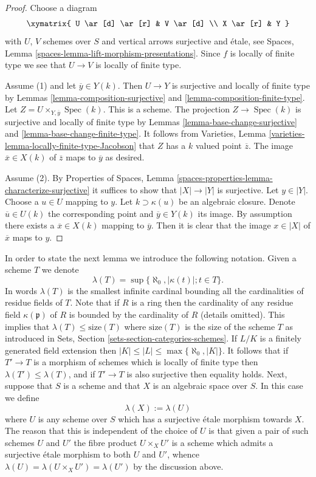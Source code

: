 \documentclass{stacks-project}
\theoremstyle{plain}
\theoremstyle{definition}
\theoremstyle{remark}
\numberwithin{equation}{subsection}
\def\Spec{\mathop{\mathrm{Spec}}}
\begin{document}
\begin{proof}
Choose a diagram
$$
\xymatrix{
U \ar[d] \ar[r] & V \ar[d] \\
X \ar[r] & Y
}
$$
with $U$, $V$ schemes over $S$ and vertical arrows surjective
and \'etale, see
Spaces, Lemma \ref{spaces-lemma-lift-morphism-presentations}.
Since $f$ is locally of finite type we see that $U \to V$ is locally of
finite type.

\medskip\noindent
Assume (1) and let $\overline{y} \in Y(k)$. Then $U \to Y$ is
surjective and locally of finite type by
Lemmas \ref{lemma-composition-surjective} and
\ref{lemma-composition-finite-type}.
Let $Z = U \times_{Y, \overline{y}} \Spec(k)$. This is a scheme.
The projection $Z \to \Spec(k)$
is surjective and locally of finite type by
Lemmas \ref{lemma-base-change-surjective} and
\ref{lemma-base-change-finite-type}.
It follows from
Varieties, Lemma \ref{varieties-lemma-locally-finite-type-Jacobson}
that $Z$ has a $k$ valued point $\overline{z}$. The image
$\overline{x} \in X(k)$ of $\overline{z}$ maps to $\overline{y}$
as desired.

\medskip\noindent
Assume (2). By
Properties of Spaces,
Lemma \ref{spaces-properties-lemma-characterize-surjective}
it suffices to show that $|X| \to |Y|$ is surjective.
Let $y \in |Y|$. Choose a $u \in U$ mapping to $y$.
Let $k \supset \kappa(u)$ be an algebraic closure. Denote
$\overline{u} \in U(k)$ the corresponding point and
$\overline{y} \in Y(k)$ its image. By assumption there exists
a $\overline{x} \in X(k)$ mapping to $\overline{y}$.
Then it is clear that the image $x \in |X|$ of $\overline{x}$
maps to $y$.
\end{proof}

\noindent
In order to state the next lemma we introduce the following
notation. Given a scheme $T$ we denote
$$
\lambda(T) = \sup\{\aleph_0, |\kappa(t)| ; t \in T\}.
$$
In words $\lambda(T)$ is the smallest infinite cardinal bounding
all the cardinalities of residue fields of $T$. Note that if $R$
is a ring then the cardinality of any residue field $\kappa(\mathfrak p)$
of $R$ is bounded by the cardinality of $R$ (details omitted).
This implies that $\lambda(T) \leq \text{size}(T)$ where
$\text{size}(T)$ is the size of the scheme $T$ as introduced in
Sets, Section \ref{sets-section-categories-schemes}.
If $L/K$ is a finitely generated field extension then
$|K| \leq |L| \leq \max\{\aleph_0, |K|\}$. It follows that if $T' \to T$
is a morphism of schemes which is locally of finite
type then $\lambda(T') \leq \lambda(T)$, and if $T' \to T$ is also
surjective then equality holds. Next, suppose that $S$ is a scheme
and that $X$ is an algebraic space over $S$. In this case we define
$$
\lambda(X) := \lambda(U)
$$
where $U$ is any scheme over $S$ which has a surjective \'etale morphism
towards $X$. The reason that this is independent of the choice of $U$
is that given a pair of such schemes $U$ and $U'$ the fibre product
$U \times_X U'$ is a scheme which admits a surjective \'etale morphism
to both $U$ and $U'$, whence $\lambda(U) = \lambda(U \times_X U') =
\lambda(U')$ by the discussion above.
\end{document}
